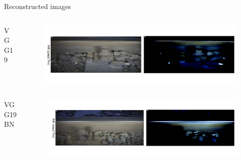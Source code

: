 \documentclass[aspectratio=169]{beamer}
\begin{document}
\begin{frame}[t]{Reconstructed images}
    \begin{columns}
        \begin{column}{0.2\textwidth}
            \centering
            VGG19
        \end{column}
        \begin{column}{0.75\textwidth}
            \begin{figure}
                \centering
                \includegraphics[width=\columnwidth,trim={0 1cm 0 1cm},clip]{./results/vgg19_vgg19/20230510_172958_predict_0.png}
            \end{figure}
        \end{column}
    \end{columns}
    \begin{columns}
        \begin{column}{0.2\textwidth}
            \centering
            VGG19 BN
        \end{column}
        \begin{column}{0.75\textwidth}
            \begin{figure}
                \centering
                \includegraphics[width=\columnwidth,trim={0 1cm 0 1cm},clip]{./results/vgg19_bn_vgg19/20230525_045131_predict_0.png}
            \end{figure}
        \end{column}
    \end{columns}
\end{frame}
\end{document}
